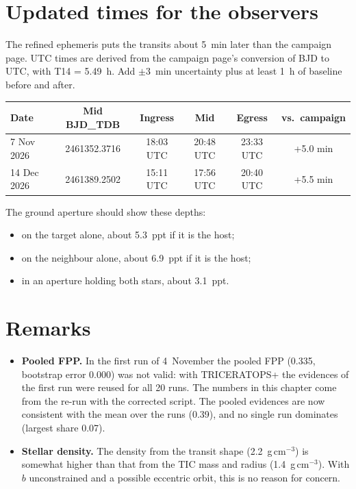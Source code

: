 \documentclass[11pt,a4paper]{report}
\begin{document}
\section*{Updated times for the observers}

The refined ephemeris puts the transits about 5~min later than the campaign
page. UTC times are derived from the campaign page's conversion of BJD to
UTC, with T14 = 5.49~h. Add $\pm$3~min uncertainty plus at least 1~h of
baseline before and after.

\begin{longtable}{@{}lccccc@{}}
\toprule
\textbf{Date} & \textbf{Mid BJD\_TDB} & \textbf{Ingress} & \textbf{Mid} & \textbf{Egress} & \textbf{vs.\ campaign}\\
\midrule\endhead
7 Nov 2026 & 2461352.3716 & 18:03 UTC & 20:48 UTC & 23:33 UTC & +5.0 min\\
14 Dec 2026 & 2461389.2502 & 15:11 UTC & 17:56 UTC & 20:40 UTC & +5.5 min\\
\bottomrule
\end{longtable}

The ground aperture should show these depths:
\begin{itemize}
\item on the target alone, about 5.3~ppt if it is the host;
\item on the neighbour alone, about 6.9~ppt if it is the host;
\item in an aperture holding both stars, about 3.1~ppt.
\end{itemize}

\section*{Remarks}
\begin{itemize}
\item \textbf{Pooled FPP.} In the first run of 4~November the pooled FPP
(0.335, bootstrap error 0.000) was not valid: with TRICERATOPS+ the evidences
of the first run were reused for all 20 runs. The numbers in this chapter come
from the re-run with the corrected script. The pooled evidences are now
consistent with the mean over the runs (0.39), and no single run dominates
(largest share 0.07).
\item \textbf{Stellar density.} The density from the transit shape
(2.2~g\,cm$^{-3}$) is somewhat higher than that from the TIC mass and radius
(1.4~g\,cm$^{-3}$). With $b$ unconstrained and a possible eccentric orbit,
this is no reason for concern.
\end{itemize}
\end{document}
